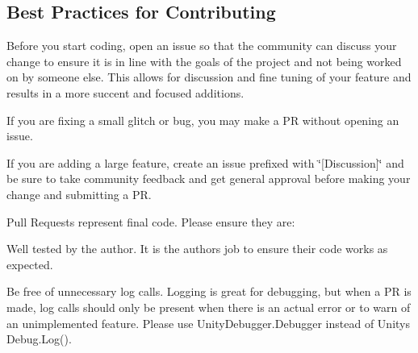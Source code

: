 \subsection*{Best Practices for Contributing}


\begin{DoxyItemize}
\item Before you start coding, open an issue so that the community can discuss your change to ensure it is in line with the goals of the project and not being worked on by someone else. This allows for discussion and fine tuning of your feature and results in a more succent and focused additions.
\begin{DoxyItemize}
\item If you are fixing a small glitch or bug, you may make a PR without opening an issue.
\item If you are adding a large feature, create an issue prefixed with \char`\"{}\mbox{[}\+Discussion\mbox{]}\char`\"{} and be sure to take community feedback and get general approval before making your change and submitting a PR.
\end{DoxyItemize}
\item Pull Requests represent final code. Please ensure they are\+:
\begin{DoxyItemize}
\item Well tested by the author. It is the author\textquotesingle{}s job to ensure their code works as expected.
\item Be free of unnecessary log calls. Logging is great for debugging, but when a PR is made, log calls should only be present when there is an actual error or to warn of an unimplemented feature. Please use {\ttfamily Unity\+Debugger.\+Debugger} instead of Unity\textquotesingle{}s {\ttfamily Debug.\+Log()}.
\end{DoxyItemize}


\end{DoxyItemize}
